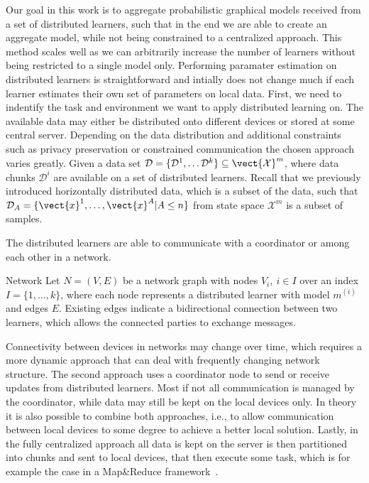 Our goal in this work is to aggregate probabilistic graphical models received from a set of distributed learners, such that in the end we are able to create an aggregate model, while not being constrained to a centralized approach.
This method scales well as we can arbitrarily increase the number of learners without being restricted to a single model only.
Performing paramater estimation on distributed learners is straightforward and intially does not change much if each learner estimates their own set of parameters on local data.
First, we need to indentify the task and environment we want to apply distributed learning on.
The available data may either be distributed onto different devices or stored at some central server.
Depending on the data distribution and additional constraints such as privacy preservation or constrained communication the chosen approach varies greatly.
Given a data set $\mathcal{D} = \{\mathcal{D}^1, \ldots \mathcal{D}^k\} \subseteq \vect{\mathcal{X}}^m$,
where data chunks $\mathcal{D}^i$ are available on a set of distributed learners.
Recall that we previously introduced horizontally distributed data, which is a subset of the data, such that $\mathcal{D}_{A} = \{\vect{x}^1, \ldots, \vect{x}^A \lvert A \leq n\}$ from state space $\mathcal{X}^m$ is a subset of samples.

The distributed learners are able to communicate with a coordinator or among each other in a network.

\begin{definition}{Network}
    Let $N = (V, E)$ be a network graph with nodes $V_i, \: i \in I$ over an index $I=\{1,\ldots,k\}$, where each node represents a distributed learner with model $m^{(i)}$ and edges $E$. 
    Existing edges indicate a bidirectional connection between two learners, which allows the connected parties to exchange messages.
\end{definition}

Connectivity between devices in networks may change over time, which requires a more dynamic approach that can deal with frequently changing network structure.
The second approach uses a coordinator node to send or receive updates from distributed learners. 
Most if not all communication is managed by the coordinator, while data may still be kept on the local devices only.
In theory it is also possible to combine both approaches, i.e., to allow communication between local devices to some degree to achieve a better local solution.
Lastly, in the fully centralized approach all data is kept on the server is then partitioned into chunks and sent to local devices, that then execute some task, which is for example the case in a Map\&Reduce framework~\cite{dean2010mapreduce}.

